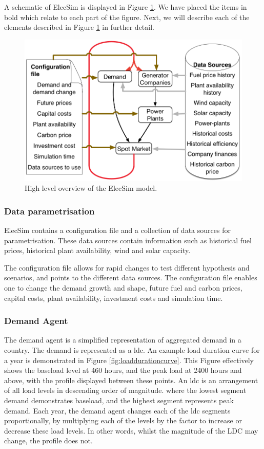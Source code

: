 A schematic of ElecSim is displayed in Figure \ref{fig:systemoverview}. We have placed the items in bold which relate to each part of the figure. Next, we will describe each of the elements described in Figure \ref{fig:systemoverview} in further detail.

\begin{figure}
	\centering
	\includegraphics[width=0.85\linewidth]{Chapter4/figures/System_overview_large.png}
	\caption{High level overview of the ElecSim model.}
	\label{fig:systemoverview}
\end{figure}

\subsubsection{Data parametrisation} ElecSim contains a configuration file and a collection of data sources for parametrisation. These data sources contain information such as historical fuel prices, historical plant availability, wind and solar capacity.

The configuration file allows for rapid changes to test different hypothesis and scenarios, and points to the different data sources. The configuration file enables one to change the demand growth and shape, future fuel and carbon prices, capital costs, plant availability, investment costs and simulation time.

\subsubsection{Demand Agent} The demand agent is a simplified representation of aggregated demand in a country. The demand is represented as a \gls{ldc}. An example load duration curve for a year is demonstrated in Figure \ref{fig:loaddurationcurve}. This Figure effectively shows the baseload level at 460 hours, and the peak load at 2400 hours and above, with the profile displayed between these points. An \acrshort{ldc} is an arrangement of all load levels in descending order of magnitude. where the lowest segment demand demonstrates baseload, and the highest segment represents peak demand. Each year, the demand agent changes each of the \acrshort{ldc} segments proportionally, by multiplying each of the levels by the factor to increase or decrease these load levels. In other words, whilst the magnitude of the LDC may change, the profile does not.

